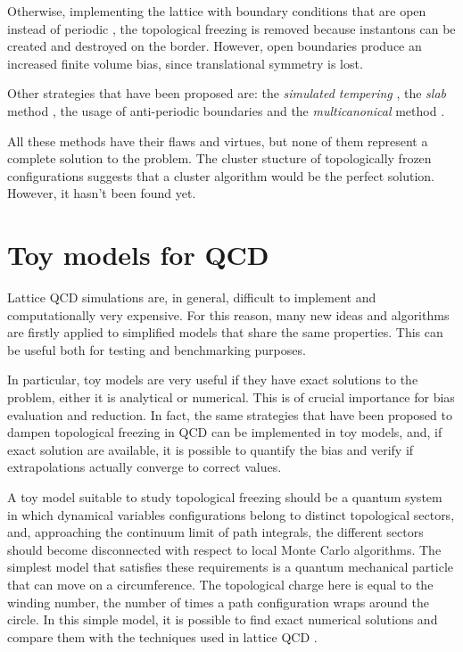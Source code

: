 Otherwise, implementing the lattice with boundary conditions that are open instead of periodic \cite{luescher:2011},
the topological freezing is removed because instantons can be created and destroyed on the border.
However, open boundaries produce an increased finite volume bias, since translational symmetry is lost.

Other strategies that have been proposed are:
the \emph{simulated tempering} \cite{delia:1996},
the \emph{slab} method \cite{slab-1, slab-2},
the usage of anti-periodic boundaries \cite{mages:2017}
and the \emph{multicanonical} method \cite{todaro:2018}.

All these methods have their flaws and virtues, but none of them represent a complete solution to the problem.
The cluster stucture of topologically frozen configurations suggests that a cluster algorithm would be the perfect solution.
However, it hasn't been found yet.

\section*{Toy models for QCD}
Lattice QCD simulations are, in general, difficult to implement and computationally very expensive.
For this reason, many new ideas and algorithms are firstly applied to simplified models that share the same properties.
This can be useful both for testing and benchmarking purposes.

In particular, toy models are very useful if they have exact solutions to the problem, either it is analytical or numerical.
This is of crucial importance for bias evaluation and reduction.
In fact, the same strategies that have been proposed to dampen topological freezing in QCD can be implemented in toy models, and,
if exact solution are available, it is possible to quantify the bias and verify if extrapolations actually converge to correct values.

A toy model suitable to study topological freezing should be a quantum system in which dynamical variables configurations belong to distinct topological sectors,
and, approaching the continuum limit of path integrals, the different sectors should become disconnected with respect to local Monte Carlo algorithms.
The simplest model that satisfies these requirements is a quantum mechanical particle that can move on a circumference.
The topological charge here is equal to the winding number, \ie the number of times a path configuration wraps around the circle.
In this simple model, it is possible to find exact numerical solutions and compare them with the techniques used in lattice QCD \cite{dromard-wagner:2014, bonati-delia:2018}.

